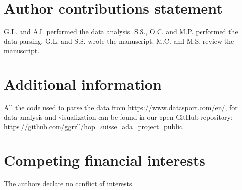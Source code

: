\documentclass[fleqn,10pt]{wlscirep}
\begin{document}
\section*{Author contributions statement}

G.L. and A.I. performed the data analysis.
S.S., O.C. and M.P. performed the data parsing.
G.L. and S.S. wrote the manuscript.
M.C. and M.S. review the manuscript.

\section*{Additional information}

All the code used to parse the data from \url{https://www.datasport.com/en/}, for data analysis and visualization can be found in our open GitHub repository: \url{https://github.com/ggrrll/hop_suisse_ada_project_public}.\\

\section*{Competing financial interests}

The authors declare no conflict of interests.



\newpage




%

%

\end{document}
